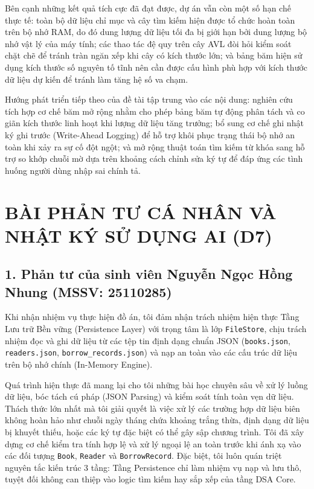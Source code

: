 \documentclass[14pt,a4paper]{extarticle}
\begin{document}
Bên cạnh những kết quả tích cực đã đạt được, dự án vẫn còn một số hạn chế thực tế: toàn bộ dữ liệu chỉ mục và cây tìm kiếm hiện được tổ chức hoàn toàn trên bộ nhớ RAM, do đó dung lượng dữ liệu tối đa bị giới hạn bởi dung lượng bộ nhớ vật lý của máy tính; các thao tác đệ quy trên cây AVL đòi hỏi kiểm soát chặt chẽ để tránh tràn ngăn xếp khi cây có kích thước lớn; và bảng băm hiện sử dụng kích thước số nguyên tố tĩnh nên cần được cấu hình phù hợp với kích thước dữ liệu dự kiến để tránh làm tăng hệ số va chạm.

Hướng phát triển tiếp theo của đề tài tập trung vào các nội dung: nghiên cứu tích hợp cơ chế băm mở rộng nhằm cho phép bảng băm tự động phân tách và co giãn kích thước linh hoạt khi lượng dữ liệu tăng trưởng; bổ sung cơ chế ghi nhật ký ghi trước (Write-Ahead Logging) để hỗ trợ khôi phục trạng thái bộ nhớ an toàn khi xảy ra sự cố đột ngột; và mở rộng thuật toán tìm kiếm từ khóa sang hỗ trợ so khớp chuỗi mờ dựa trên khoảng cách chỉnh sửa ký tự để đáp ứng các tình huống người dùng nhập sai chính tả.

\newpage
\section*{BÀI PHẢN TƯ CÁ NHÂN VÀ NHẬT KÝ SỬ DỤNG AI (D7)}

\subsection*{1. Phản tư của sinh viên Nguyễn Ngọc Hồng Nhung (MSSV: 25110285)}

Khi nhận nhiệm vụ thực hiện đồ án, tôi đảm nhận trách nhiệm hiện thực Tầng Lưu trữ Bền vững (Persistence Layer) với trọng tâm là lớp \texttt{FileStore}, chịu trách nhiệm đọc và ghi dữ liệu từ các tệp tin định dạng chuẩn JSON (\texttt{books.json}, \texttt{readers.json}, \texttt{borrow\_records.json}) và nạp an toàn vào các cấu trúc dữ liệu trên bộ nhớ chính (In-Memory Engine).

Quá trình hiện thực đã mang lại cho tôi những bài học chuyên sâu về xử lý luồng dữ liệu, bóc tách cú pháp (JSON Parsing) và kiểm soát tính toàn vẹn dữ liệu. Thách thức lớn nhất mà tôi giải quyết là việc xử lý các trường hợp dữ liệu biên không hoàn hảo như chuỗi ngày tháng chứa khoảng trắng thừa, định dạng dữ liệu bị khuyết thiếu, hoặc các ký tự đặc biệt có thể gây sập chương trình. Tôi đã xây dựng cơ chế kiểm tra tính hợp lệ và xử lý ngoại lệ an toàn trước khi ánh xạ vào các đối tượng \texttt{Book}, \texttt{Reader} và \texttt{BorrowRecord}. Đặc biệt, tôi luôn quán triệt nguyên tắc kiến trúc 3 tầng: Tầng Persistence chỉ làm nhiệm vụ nạp và lưu thô, tuyệt đối không can thiệp vào logic tìm kiếm hay sắp xếp của tầng DSA Core.
\end{document}
